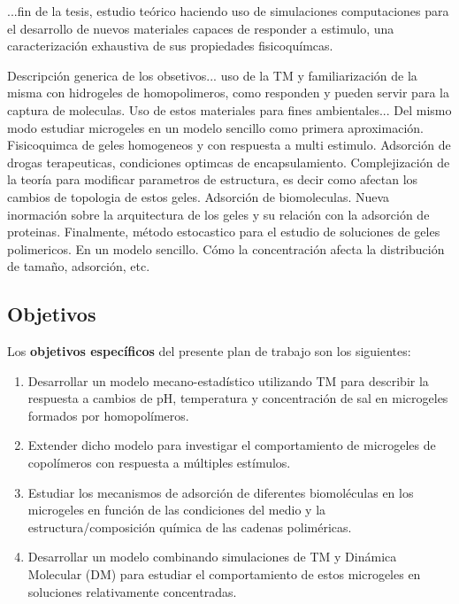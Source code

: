 ...fin de la tesis, estudio te\'orico haciendo uso de simulaciones computaciones para el desarrollo de nuevos materiales capaces de responder a estimulo, una caracterizaci\'on exhaustiva de sus propiedades fisicoqu\'imcas.

Descripci\'on generica de los obsetivos... uso de la TM y familiarizaci\'on de la misma con hidrogeles de homopolimeros, como responden y pueden servir para la captura de moleculas. Uso de estos materiales para fines ambientales...
Del mismo modo estudiar microgeles en un modelo sencillo como primera aproximaci\'on. Fisicoquimca de geles homogeneos y con respuesta a multi estimulo. Adsorci\'on de drogas terapeuticas, condiciones optimcas de encapsulamiento.
Complejizaci\'on de la teor\'ia para modificar parametros de estructura, es decir como afectan los cambios de topologia de estos geles.
Adsorci\'on de biomoleculas. Nueva inormaci\'on sobre la arquitectura de los geles y su relaci\'on con la adsorci\'on de proteinas. 
Finalmente, m\'etodo estocastico para el estudio de soluciones de geles polimericos. En un modelo sencillo.
C\'omo la concentraci\'on afecta la distribuci\'on de tama\~no, adsorci\'on, etc.
\subsection{Objetivos}

Los {\bf objetivos específicos} del presente plan de trabajo son los siguientes:
%
\begin{enumerate}
\item Desarrollar un modelo mecano-estadístico utilizando TM para describir la respuesta a cambios de pH, temperatura y concentración de sal en microgeles formados por homopolímeros.%
\item Extender dicho modelo para investigar el comportamiento de microgeles de copolímeros con respuesta a múltiples estímulos.%
\item Estudiar los mecanismos de adsorción de diferentes biomoléculas en los microgeles en función de las condiciones del medio y la estructura/composición química de las cadenas poliméricas.%
\item Desarrollar un modelo combinando simulaciones de TM y Dinámica Molecular (DM) para estudiar el comportamiento de estos microgeles en soluciones relativamente concentradas.%
\end{enumerate}
%


